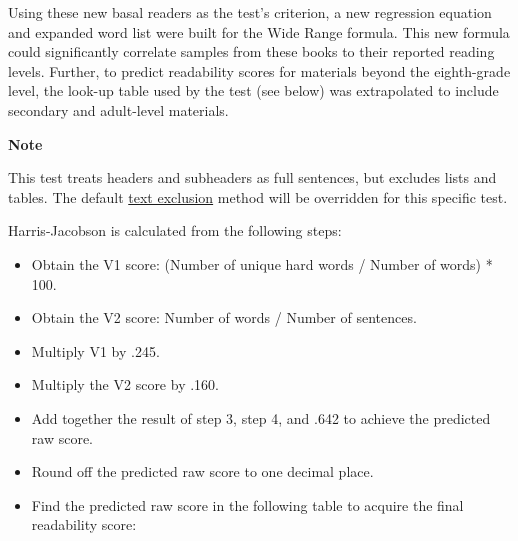 \documentclass[
]{book}
\providecommand{\tightlist}{%
  \setlength{\itemsep}{0pt}\setlength{\parskip}{0pt}}
\newenvironment{notesection}
    {
    \begin{tcolorbox}[colframe=mediumblue,colback=lightblue,coltext=mediumblue,arc=3mm]
    \faLightbulb[regular] \textbf{Note} \newline
    }
    {
    \end{tcolorbox}
    }
\theoremstyle{definition}
\theoremstyle{definition}
\theoremstyle{definition}
\theoremstyle{definition}
\theoremstyle{remark}
\begin{document}
Using these new basal readers as the test's criterion, a new regression equation and expanded word list were built for the Wide Range formula. This new formula could significantly correlate samples from these books to their reported reading levels. Further, to predict readability scores for materials beyond the eighth-grade level, the look-up table used by the test (see below) was extrapolated to include secondary and adult-level materials.

\begin{notesection}
This test treats headers and subheaders as full sentences, but excludes lists and tables. The default \protect\hyperlink{options-text-exclusion}{text exclusion} method will be overridden for this specific test.

\end{notesection}

\begin{minipage}{\textwidth}

Harris-Jacobson is calculated from the following steps:

\begin{itemize}
\tightlist
\item
  Obtain the V1 score: (Number of unique hard words / Number of words) * 100.
\item
  Obtain the V2 score: Number of words / Number of sentences.
\item
  Multiply V1 by .245.
\item
  Multiply the V2 score by .160.
\item
  Add together the result of step 3, step 4, and .642 to achieve the predicted raw score.
\item
  Round off the predicted raw score to one decimal place.
\item
  Find the predicted raw score in the following table to acquire the final readability score:
\end{itemize}

\end{minipage}
\end{document}

